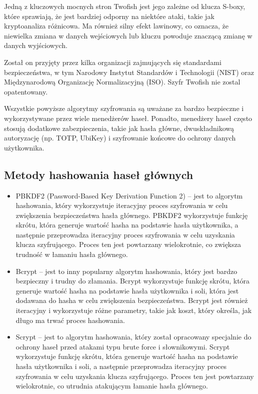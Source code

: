 Jedną z kluczowych mocnych stron Twofish jest jego zależne od klucza S-boxy, które sprawiają, że jest bardziej odporny na niektóre ataki, takie jak kryptoanaliza różnicowa. Ma również silny efekt lawinowy, co oznacza, że niewielka zmiana w danych wejściowych lub kluczu powoduje znaczącą zmianę w danych wyjściowych.

Został on przyjęty przez kilka organizacji zajmujących się standardami bezpieczeństwa, w tym Narodowy Instytut Standardów i Technologii (NIST) oraz Międzynarodową Organizację Normalizacyjną (ISO). Szyfr Twofish nie zostal opatentowany. 


Wszystkie powyższe algorytmy szyfrowania są uważane za bardzo bezpieczne i wykorzystywane przez wiele menedżerów haseł. Ponadto, menedżery haseł często stosują dodatkowe zabezpieczenia, takie jak hasła główne, dwuskładnikową autoryzację (np. TOTP, UbiKey) i szyfrowanie końcowe do ochrony danych użytkownika.

\subsection{Metody hashowania haseł głównych}

\begin{itemize}
    \item PBKDF2 (Password-Based Key Derivation Function 2) – jest to algorytm hashowania, który wykorzystuje iteracyjny proces szyfrowania w celu zwiększenia bezpieczeństwa hasła głównego. PBKDF2 wykorzystuje funkcję skrótu, która generuje wartość hasha na podstawie hasła użytkownika, a następnie przeprowadza iteracyjny proces szyfrowania w celu uzyskania klucza szyfrującego. Proces ten jest powtarzany wielokrotnie, co zwiększa trudność w łamaniu hasła głównego.
    \item Bcrypt – jest to inny popularny algorytm hashowania, który jest bardzo bezpieczny i trudny do złamania. Bcrypt wykorzystuje funkcję skrótu, która generuje wartość hasha na podstawie hasła użytkownika i soli, która jest dodawana do hasha w celu zwiększenia bezpieczeństwa. Bcrypt jest również iteracyjny i wykorzystuje różne parametry, takie jak koszt, który określa, jak długo ma trwać proces hashowania.
    \item Scrypt – jest to algorytm hashowania, który został opracowany specjalnie do ochrony haseł przed atakami typu brute force i słownikowymi. Scrypt wykorzystuje funkcję skrótu, która generuje wartość hasha na podstawie hasła użytkownika i soli, a następnie przeprowadza iteracyjny proces szyfrowania w celu uzyskania klucza szyfrującego. Proces ten jest powtarzany wielokrotnie, co utrudnia atakującym łamanie hasła głównego.
\end{itemize}
